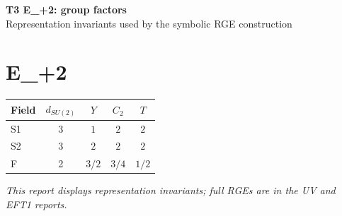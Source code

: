 \documentclass[10pt,a4paper]{article}
\begin{document}
\begin{center}
{\Large\bfseries T3 E\_+2: group factors}\\[4pt]
Representation invariants used by the symbolic RGE construction
\end{center}
\bigskip
\section*{E\_+2}
\begin{longtable}{@{}lcccc@{}}
\toprule Field & $d_{SU(2)}$ & $Y$ & $C_2$ & $T$ \\
\midrule
S1 & 3 & $1$ & $2$ & $2$ \\
S2 & 3 & $2$ & $2$ & $2$ \\
F & 2 & $3/2$ & $3/4$ & $1/2$ \\
\bottomrule
\end{longtable}
\emph{This report displays representation invariants; full RGEs are in the UV and EFT1 reports.}
\end{document}

